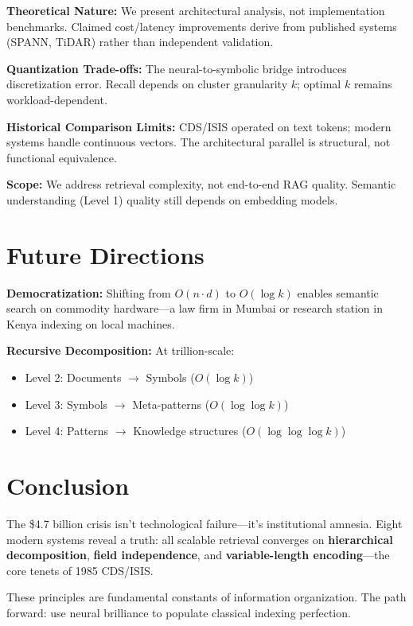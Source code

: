 \documentclass[manuscript,screen,nonacm]{acmart}
\begin{document}
\textbf{Theoretical Nature:} We present architectural analysis, not implementation benchmarks. Claimed cost/latency improvements derive from published systems (SPANN, TiDAR) rather than independent validation.

\textbf{Quantization Trade-offs:} The neural-to-symbolic bridge introduces discretization error. Recall depends on cluster granularity $k$; optimal $k$ remains workload-dependent.

\textbf{Historical Comparison Limits:} CDS/ISIS operated on text tokens; modern systems handle continuous vectors. The architectural parallel is structural, not functional equivalence.

\textbf{Scope:} We address retrieval complexity, not end-to-end RAG quality. Semantic understanding (Level 1) quality still depends on embedding models.

\section{Future Directions}

\textbf{Democratization:} Shifting from $O(n \cdot d)$ to $O(\log k)$ enables semantic search on commodity hardware---a law firm in Mumbai or research station in Kenya indexing on local machines.

\textbf{Recursive Decomposition:} At trillion-scale:
\begin{itemize}
    \item Level 2: Documents $\to$ Symbols ($O(\log k)$)
    \item Level 3: Symbols $\to$ Meta-patterns ($O(\log \log k)$)
    \item Level 4: Patterns $\to$ Knowledge structures ($O(\log \log \log k)$)
\end{itemize}

\section{Conclusion}

The \$4.7 billion crisis isn't technological failure---it's institutional amnesia. Eight modern systems reveal a truth: all scalable retrieval converges on \textbf{hierarchical decomposition}, \textbf{field independence}, and \textbf{variable-length encoding}---the core tenets of 1985 CDS/ISIS.

These principles are fundamental constants of information organization. The path forward: use neural brilliance to populate classical indexing perfection.
\end{document}
